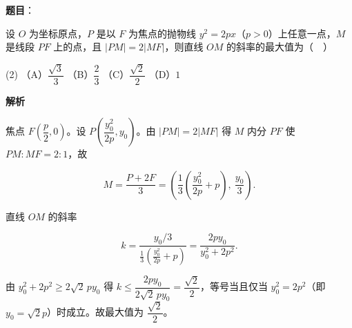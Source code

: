 \begin{answer}

\textbf{题目}：

设 \(O\) 为坐标原点，\(P\) 是以 \(F\) 为焦点的抛物线 \(y^{2}=2px\)（\(p>0\)）上任意一点，\(M\) 是线段 \(PF\) 上的点，且 \(|PM|=2|MF|\)，则直线 \(OM\) 的斜率的最大值为（　）

\begin{gkopts}(2)
\task （A）\(\dfrac{\sqrt{3}}{3}\)
\task （B）\(\dfrac{2}{3}\)
\task （C）\(\dfrac{\sqrt{2}}{2}\)
\task （D）\(1\)
\end{gkopts}

\textbf{解析}

焦点 \(F\left(\dfrac{p}{2},0\right)\)。设 \(P\left(\dfrac{y_0^{2}}{2p},y_0\right)\)。由 \(|PM|=2|MF|\) 得 \(M\) 内分 \(PF\) 使 \(PM:MF=2:1\)，故

\nopagebreak[4]
\[
M=\frac{P+2F}{3}=\left(\frac{1}{3}\left(\frac{y_0^{2}}{2p}+p\right),\ \frac{y_0}{3}\right).
\]

直线 \(OM\) 的斜率

\nopagebreak[4]
\[
k=\frac{y_0/3}{\frac{1}{3}\left(\frac{y_0^{2}}{2p}+p\right)}=\frac{2py_0}{y_0^{2}+2p^{2}}.
\]

由 \(y_0^{2}+2p^{2}\geqslant2\sqrt{2}\,py_0\) 得 \(k\leqslant\dfrac{2py_0}{2\sqrt{2}\,py_0}=\dfrac{\sqrt{2}}{2}\)，等号当且仅当 \(y_0^{2}=2p^{2}\)（即 \(y_0=\sqrt{2}p\)）时成立。故最大值为 \(\dfrac{\sqrt{2}}{2}\)。


\end{answer}

